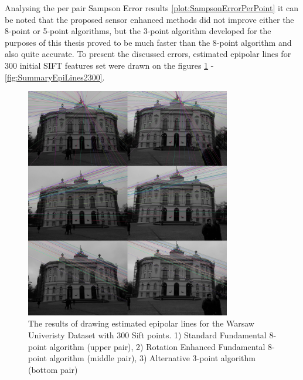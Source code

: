 Analysing the per pair Sampson Error results \ref{plot:SampsonErrorPerPoint} it can be noted that the proposed sensor enhanced methods did not improve either the 8-point or 5-point algorithms, but the 3-point algorithm developed for the purposes of this thesis proved to be much faster than the 8-point algorithm and also quite accurate. To present the discussed errors, estimated epipolar lines for 300 initial SIFT features set were drawn on the figures \ref{fig:SummaryEpiLines1300} - \ref{fig:SummaryEpiLines2300}.
\begin{figure}[b!]
    \centering
    \includegraphics[width=0.8\textwidth]{summary1Sift300}
    \caption{The results of drawing estimated epipolar lines for the Warsaw Univeristy Dataset with 300 Sift points. 1) Standard Fundamental 8-point algorithm (upper pair), 2) Rotation Enhanced Fundamental 8-point algorithm (middle pair), 3) Alternative 3-point algorithm (bottom pair) }
    \label{fig:SummaryEpiLines1300}
\end{figure}
